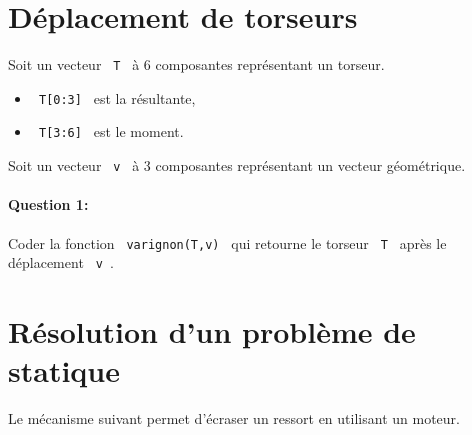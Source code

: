 




\section{Déplacement de torseurs}

Soit un vecteur \verb? T ? à 6 composantes représentant un torseur.

\begin{itemize}
 \item \verb? T[0:3] ? est la résultante,
 \item \verb? T[3:6] ? est le moment.
\end{itemize}

Soit un vecteur \verb? v ? à 3 composantes représentant un vecteur géométrique.

\paragraph{Question 1:} Coder la fonction \verb? varignon(T,v) ? qui retourne le torseur \verb? T ? après le déplacement \verb? v ?.

\section{Résolution d'un problème de statique}

Le mécanisme suivant permet d'écraser un ressort en utilisant un moteur.

~\

